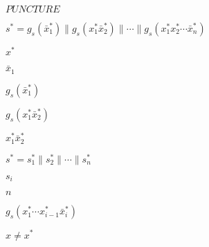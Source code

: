 \documentclass[10pt]{book}
\begin{document}
\begin{mdSnippets}
\begin{mdInlineSnippet}[0ae38247a0db2f3b37545a2237f9ddb7]%
$PUNCTURE$\end{mdInlineSnippet}%
\begin{mdInlineSnippet}[52c7f9d74f52393f5d24a2ae254877d5]%
$s^* = g_s(\bar{x}_1^*) \| g_s(x_1^*\bar{x}_2^*) \| \cdots  \| g_s(x_1^*x_2^* \cdots \bar{x}_{n}^*)$\end{mdInlineSnippet}%
\begin{mdInlineSnippet}[5d9075efa0ec4b2e8228505844f11742]%
$x^*$\end{mdInlineSnippet}%
\begin{mdInlineSnippet}[0e0257bb099669bb47ffe18e5096d737]%
$\bar{x}_1$\end{mdInlineSnippet}%
\begin{mdInlineSnippet}%
$g_s(\bar{x}_1^*)$\end{mdInlineSnippet}%
\begin{mdInlineSnippet}%
$g_s(x_1^*\bar{x}_2^*)$\end{mdInlineSnippet}%
\begin{mdInlineSnippet}%
$x_1^*\bar{x}_2^*$\end{mdInlineSnippet}%
\begin{mdInlineSnippet}[110c4a1264c990c8059df8e17d65cd96]%
$s^* = s_1^* \| s_2^* \| \cdots \| s_n^*$\end{mdInlineSnippet}%
\begin{mdInlineSnippet}[e406ac4d7c470823a8619c13dd7101be]%
$s_i$\end{mdInlineSnippet}%
\begin{mdInlineSnippet}[7b8b965ad4bca0e41ab51de7b31363a1]%
$n$\end{mdInlineSnippet}%
\begin{mdInlineSnippet}[7309f3c82675f3536e9fde321ca6f492]%
$g_s(x_1^*\cdots x_{i-1}^*\bar{x}_i^*)$\end{mdInlineSnippet}%
\begin{mdInlineSnippet}[c9233e03983076893b8ac6591e0638d1]%
$x \neq x^*$\end{mdInlineSnippet}%
\begin{mdInlineSnippet}[91d5297fa3c7debfef111890800ba071]%

\end{mdInlineSnippet}
\end{mdSnippets}
\end{document}
